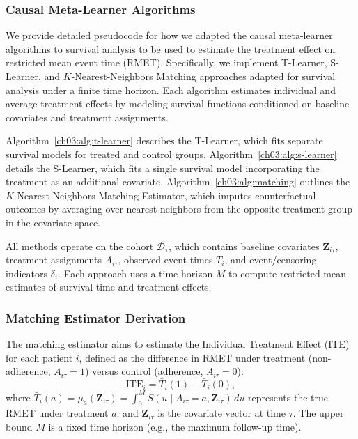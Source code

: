 \subsubsection{Causal Meta-Learner Algorithms}
\label{ch03:apd:causal-meta-learner-algorithms}





We provide detailed pseudocode for how we adapted the causal meta-learner algorithms to survival analysis to be used to estimate the treatment effect on restricted mean event time (RMET). 
Specifically, we implement T-Learner, S-Learner, and \(K\)-Nearest-Neighbors Matching approaches adapted for survival analysis under a finite time horizon. 
Each algorithm estimates individual and average treatment effects by modeling survival functions conditioned on baseline covariates and treatment assignments. 

Algorithm~\ref{ch03:alg:t-learner} describes the T-Learner, which fits separate survival models for treated and control groups.
Algorithm~\ref{ch03:alg:s-learner} details the S-Learner, which fits a single survival model incorporating the treatment as an additional covariate. 
Algorithm~\ref{ch03:alg:matching} outlines the \(K\)-Nearest-Neighbors Matching Estimator, which imputes counterfactual outcomes by averaging over nearest neighbors from the opposite treatment group in the covariate space.

All methods operate on the cohort \(\mathcal{D}_\tau\), which contains baseline covariates \(\mathbf{Z}_{i\tau}\), treatment assignments \(A_{i\tau}\), observed event times \(T_i\), and event/censoring indicators \(\delta_i\). 
Each approach uses a time horizon \(M\) to compute restricted mean estimates of survival time and treatment effects.











\subsubsection{Matching Estimator Derivation}
\label{ch03:apd:matching_derivation}
The matching estimator aims to estimate the Individual Treatment Effect (ITE) for each patient $ i $, defined as the difference in RMET under treatment (non-adherence, $ A_{i\tau} = 1 $) versus control (adherence, $ A_{i\tau} = 0 $):
$$ \text{ITE}_i = \bar{T}_i(1) - \bar{T}_i(0), $$
where $ \bar{T}_i(a) = \mu_a(\mathbf{Z}_{i\tau}) = \int_{0}^{M} S(u \mid A_{i\tau} = a, \mathbf{Z}_{i\tau}) \, du $ represents the true RMET under treatment $ a $, and $ \mathbf{Z}_{i\tau} $ is the covariate vector at time $ \tau $.
The upper bound $ M $ is a fixed time horizon (e.g., the maximum follow-up time).

